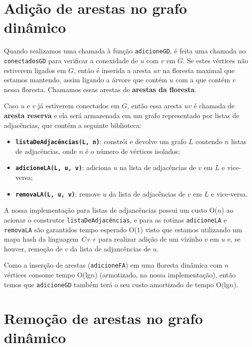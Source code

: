 \section{Adição de arestas no grafo dinâmico}
\label{sec:dynamic-graph-edge-addition}

Quando realizamos uma chamada à função \texttt{adicioneGD}, é feita uma chamada ao \texttt{conectadosGD} para verificar a conexidade de $u$ com $v$ em $G$. Se estes vértices não estiverem ligados em $G$, então é inserida a aresta $uv$ na floresta maximal que estamos mantendo, assim ligando a árvore que contém $u$ com a que contém $v$ nessa floresta. Chamamos essas arestas de \textbf{arestas da floresta}.

Caso $u$ e $v$ já estiverem conectados em $G$, então essa aresta $uv$ é chamada de \textbf{aresta reserva} e ela será armazenada em um grafo representado por listas de adjacências, que contém a seguinte biblioteca:

\begin{itemize}
    \item \texttt{\textbf{listaDeAdjacências(L, n)}}: constrói e devolve um grafo $L$ contendo $n$ listas de adjacências, onde $n$ é o número de vértices isolados;
    \item \texttt{\textbf{adicioneLA(L, u, v)}}: adiciona $u$ na lista de adjacências de $v$ em $L$ e vice-versa;
    \item \texttt{\textbf{removaLA(L, u, v)}}: remove $u$ da lista de adjacências de $v$ em $L$ e vice-versa.
\end{itemize} 

A nossa implementação \cite{chung2025} para listas de adjancências possui um custo O($n$) ao acionar o construtor \texttt{listaDeAdjacências}, e para 
as rotinas \texttt{adicioneLA} e \texttt{removaLA} são garantidos tempo esperado O($1$) visto que estamos utilizando um mapa hash da linguagem \textit{C++} para realizar adição de um vizinho $v$ em $u$ e, se houver, remoção de $v$ da lista de adjancências de $u$.

Como a inserção de arestas (\texttt{adicioneFA}) em uma floresta dinâmica com $n$ vértices consome tempo O(lg$n$) (armotizado, na nossa implementação), então temos que \texttt{adicioneGD} também terá o seu custo amortizado de tempo O(lg$n$). 

\section{Remoção de arestas no grafo dinâmico}
\label{sec:dynamic-graph-edge-removal}


